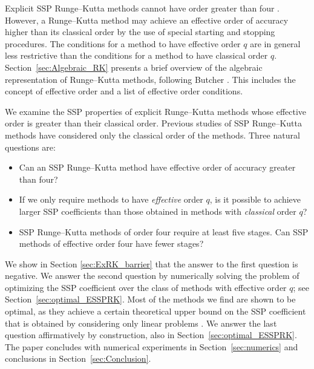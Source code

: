 \documentclass{siamltex}  %
\begin{document}
Explicit SSP Runge--Kutta methods cannot have order greater
than four \cite{Ruuth2002}.  However, a Runge--Kutta method may 
achieve an effective order of accuracy higher than its classical order 
by the use of special starting and stopping procedures.
The conditions for a method to have effective order $q$ are 
in general less restrictive than the conditions for a method
to have classical order $q$.
Section~\ref{sec:Algebraic_RK} presents a brief overview of the
algebraic representation of Runge--Kutta methods, following Butcher
\cite{Butcher2008_book}.
This includes the concept of effective order and a list of effective
order conditions.

We examine the SSP properties of explicit Runge--Kutta methods whose
effective order is greater than their classical order.
Previous studies of SSP Runge--Kutta methods have considered only the
classical order of the methods.
Three natural questions are:
\begin{itemize}
    \item Can an SSP Runge--Kutta method have effective order of accuracy greater than four?
    \item If we only require methods to have {\em effective} order $q$, is it possible to achieve larger
            SSP coefficients than those obtained in methods with {\em classical} order $q$?
    \item SSP Runge--Kutta methods of order four require at least five stages.  Can SSP methods of 
          effective order four have fewer stages?
\end{itemize}
We show in Section \ref{sec:ExRK_barrier} that the answer to the first question is negative.
We answer the second question by numerically solving the problem of optimizing
the SSP coefficient over the class of methods with effective order $q$;
see Section~\ref{sec:optimal_ESSPRK}.  
Most of the methods we find are shown to be optimal, as they achieve a certain theoretical
upper bound on the SSP coefficient that is obtained by considering only
linear problems \cite{Kraaijevanger1986}.
We answer the last question affirmatively
by construction, also in Section~\ref{sec:optimal_ESSPRK}.
The paper concludes with numerical experiments in
Section~\ref{sec:numerics} and conclusions in
Section~\ref{sec:Conclusion}.
\end{document}
